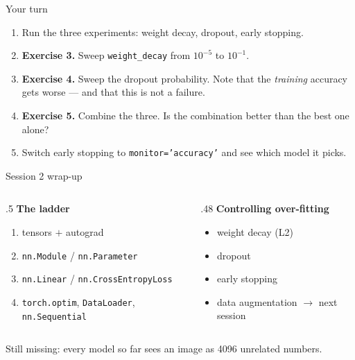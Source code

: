 \documentclass[aspectratio=169,10pt]{beamer}
\begin{document}
\begin{frame}{Your turn}
\begin{practice}
\begin{enumerate}
  \item Run the three experiments: weight decay, dropout, early stopping.
  \item \textbf{Exercise 3.} Sweep \texttt{weight\_decay} from $10^{-5}$ to $10^{-1}$.
  \item \textbf{Exercise 4.} Sweep the dropout probability. Note that the \emph{training}
        accuracy gets worse --- and that this is not a failure.
  \item \textbf{Exercise 5.} Combine the three. Is the combination better than the best one
        alone?
  \item Switch early stopping to \texttt{monitor='accuracy'} and see which model it picks.
\end{enumerate}
\end{practice}
\end{frame}

\begin{frame}{Session 2 wrap-up}
\begin{columns}[T]
\begin{column}{.5\textwidth}
\textbf{The ladder}
\begin{enumerate}\small
  \item tensors $+$ autograd
  \item \texttt{nn.Module} / \texttt{nn.Parameter}
  \item \texttt{nn.Linear} / \texttt{nn.CrossEntropyLoss}
  \item \texttt{torch.optim}, \texttt{DataLoader}, \texttt{nn.Sequential}
\end{enumerate}
\end{column}
\begin{column}{.48\textwidth}
\textbf{Controlling over-fitting}
\begin{itemize}\small
  \item weight decay (L2)
  \item dropout
  \item early stopping
  \item data augmentation $\rightarrow$ next session
\end{itemize}
\end{column}
\end{columns}
\vspace{.8em}
\begin{center}
Still missing: every model so far sees an image as 4096 unrelated numbers.
\end{center}
\end{frame}
\end{document}
